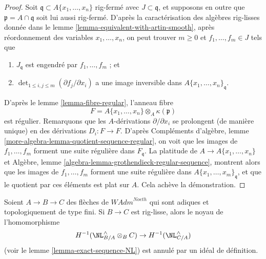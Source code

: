 \begin{proof}
\medskip\noindent
Soit $\mathfrak q \subset A\{x_1, \ldots, x_n\}$ rig-fermé avec
$J \subset \mathfrak q$, et supposons en outre que $\mathfrak p = A \cap \mathfrak q$
soit lui aussi rig-fermé. D'après la caractérisation des algèbres rig-lisses
donnée dans le lemme \ref{lemma-equivalent-with-artin-smooth},
après réordonnement des variables $x_1, \ldots, x_n$,
on peut trouver $m \geq 0$ et $f_1, \ldots, f_m \in J$ tels que
\begin{enumerate}
\item $J_\mathfrak q$ est engendré par $f_1, \ldots, f_m$ ; et
\item $\det_{1 \leq i, j \leq m}(\partial f_j/ \partial x_i)$
a une image inversible dans $A\{x_1, \ldots, x_n\}_\mathfrak q$.
\end{enumerate}
D'après le lemme \ref{lemma-fibre-regular}, l'anneau fibre
$$
F = A\{x_1, \ldots, x_n\} \otimes_A \kappa(\mathfrak p)
$$
est régulier. Remarquons que les $A$-dérivations $\partial / \partial x_i$
se prolongent (de manière unique) en des dérivations $D_i : F \to F$. D'après
Compléments d'algèbre, lemme \ref{more-algebra-lemma-quotient-sequence-regular},
on voit que les images de $f_1, \ldots, f_m$ forment une suite régulière dans
$F_\mathfrak q$. La platitude de $A \to A\{x_1, \ldots, x_n\}$
et Algèbre, lemme \ref{algebra-lemma-grothendieck-regular-sequence},
montrent alors que les images de $f_1, \ldots, f_m$ forment une suite régulière dans
$A\{x_1, \ldots, x_m\}_\mathfrak q$, et que le quotient par
ces éléments est plat sur $A$. Cela achève la démonstration.
\end{proof}

\begin{lemma}
\label{lemma-exact-sequence-NL-rig-smooth}
Soient $A \to B \to C$ des flèches de $\textit{WAdm}^{Noeth}$
qui sont adiques et topologiquement de type fini. Si $B \to C$
est rig-lisse, alors le noyau de l'homomorphisme
$$
H^{-1}(\NL_{B/A}^\wedge \otimes_B C) \to H^{-1}(\NL_{C/A}^\wedge)
$$
(voir le lemme \ref{lemma-exact-sequence-NL})
est annulé par un idéal de définition.
\end{lemma}

